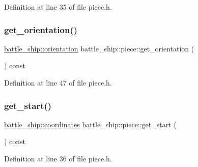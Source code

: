 Definition at line 35 of file piece.\+h.

\mbox{\label{classbattle__ship_1_1piece_a4d7a31fb7ab006c7063dbcd346b5935c}} 
\subsubsection{\texorpdfstring{get\+\_\+orientation()}{get\_orientation()}}
{\footnotesize\ttfamily \hyperlink{namespacebattle__ship_aed87488f0a73f0d0679fe343fb61c784}{battle\+\_\+ship\+::orientation} battle\+\_\+ship\+::piece\+::get\+\_\+orientation (\begin{DoxyParamCaption}{ }\end{DoxyParamCaption}) const\hspace{0.3cm}{\ttfamily [inline]}}



Definition at line 47 of file piece.\+h.

\mbox{\label{classbattle__ship_1_1piece_a45f97829a407e4d9fc7f21c606410f12}} 
\subsubsection{\texorpdfstring{get\+\_\+start()}{get\_start()}}
{\footnotesize\ttfamily \hyperlink{structbattle__ship_1_1coordinates}{battle\+\_\+ship\+::coordinates} battle\+\_\+ship\+::piece\+::get\+\_\+start (\begin{DoxyParamCaption}{ }\end{DoxyParamCaption}) const\hspace{0.3cm}{\ttfamily [inline]}}



Definition at line 36 of file piece.\+h.

\mbox{\label{classbattle__ship_1_1piece_a9ff7661a72b6b592bba67637aa5a7692}} 
